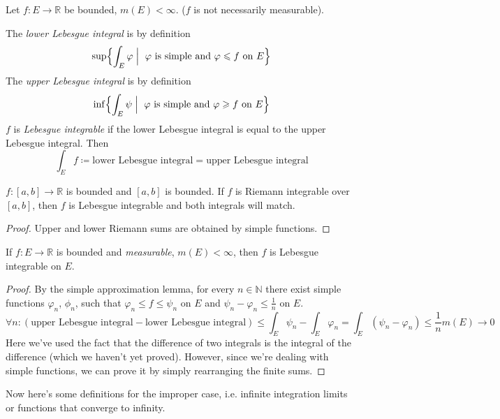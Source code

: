 \begin{definition}
    Let $f : E \to \mathbb{R}$ be bounded, $m(E) < \infty$.
    ($f$ is not necessarily measurable).

    The \textit{lower Lebesgue integral} is by definition
    \[ \sup\Bigl\{ \int_E \varphi \mathrel{\Big\vert} \text{ $\varphi$ is simple and $\varphi \le f$ on $E$} \Bigr\} \]
    The \textit{upper Lebesgue integral} is by definition
    \[ \inf\Bigl\{ \int_E \psi \mathrel{\Big\vert} \text{ $\varphi$ is simple and $\varphi \ge f$ on $E$} \Bigr\} \]
    $f$ is \textit{Lebesgue integrable} if the lower Lebesgue integral
    is equal to the upper Lebesgue integral. Then
    \[ \int_E f \coloneqq \text{lower Lebesgue integral} = \text{upper Lebesgue integral} \]
\end{definition}

\begin{theorem}
    $f : [a, b] \to \mathbb{R}$ is bounded and $[a, b]$ is bounded.
    If $f$ is Riemann integrable over $[a, b]$, then 
    $f$ is Lebesgue integrable and both integrals will match.
\end{theorem}
\begin{proof}
    Upper and lower Riemann sums are obtained by simple functions.
\end{proof}
\begin{theorem}
    If $f : E \to \mathbb{R}$ is bounded and \textit{measurable}, 
    $m(E) < \infty$, then $f$ is Lebesgue integrable on $E$.
\end{theorem}
\begin{proof}
    By the simple approximation lemma, for every $n \in \mathbb{N}$
    there exist simple functions $\varphi_n$, $\phi_n$, such that
    $\varphi_n \le f \le \psi_n$ on $E$ and
    $\psi_n - \varphi_n \le \frac{1}{n}$ on $E$.
    \[
        \forall n: 
        (\text{upper Lebesgue integral} - \text{lower Lebesgue integral}) \le
        \int_E \psi_n - \int_E \varphi_n = \int_E (\psi_n - \varphi_n) \le
        \frac{1}{n} m(E) \to 0
    \]
    Here we've used the fact that the difference of two integrals
    is the integral of the difference (which we haven't yet proved).
    However, since we're dealing with simple functions,
    we can prove it by simply rearranging the finite sums.
\end{proof}

Now here's some definitions for the improper case,
i.e. infinite integration limits or functions that converge to infinity.

